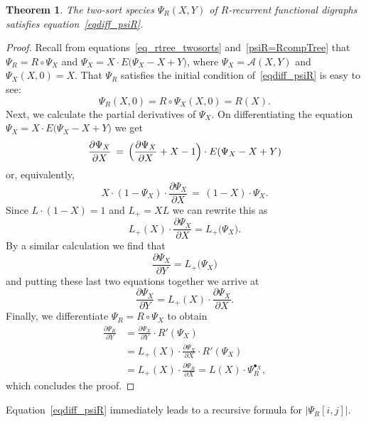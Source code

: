 \documentclass[a4paper,11pt,UKenglish]{article}
\newcommand{\Set}{E}
\newcommand{\Lin}{L}
\newcommand{\rtree}{\mathcal{A}}
\newcommand{\ddy}[1]{\displaystyle{\frac{\partial{#1}}{\partial Y}}}
\newcommand{\ddx}[1]{\displaystyle{\frac{\partial{#1}}{\partial X}}}
\newcommand{\pointX}{^{\bullet_X}}
\newtheorem{theorem}{Theorem}[section]
\theoremstyle{definition}
\begin{document}
\begin{theorem}\label{psiX=tree}
  The two-sort species $\Psi_R(X,Y)$ of $R$-recurrent functional
  digraphs satisfies equation~\eqref{eqdiff_psiR}.
\end{theorem}
\begin{proof}
  Recall from equations~\eqref{eq_rtree_twosorts}
  and~\eqref{psiR=RcompTree} that $\Psi_R=R\circ\Psi_X$ and
  $\Psi_X=X\cdot\Set\bigl(\Psi_X-X+Y\bigr)$, where
  $\Psi_X=\rtree(X,Y)$ and $\Psi_X(X,0)=X$. That $\Psi_R$ satisfies
  the initial condition of~\eqref{eqdiff_psiR} is easy to see:
  \[
    \Psi_R(X,0)=R\circ\Psi_X(X,0)=R(X).
  \]
  Next, we calculate the partial derivatives of $\Psi_X$. On differentiating
  the equation $\Psi_X=X\cdot\Set\bigl(\Psi_X-X+Y\bigr)$ we get
  \[
    \ddx{\Psi_X} \,=\, \Bigl(\ddx{\Psi_X} + X - 1\Bigr)\cdot \Set(\Psi_X-X+Y)
  \]
  or, equivalently,
  \[
    X\cdot(1-\Psi_X)\cdot \ddx{\Psi_X} \,=\, (1-X)\cdot \Psi_X.
  \]
  Since $\Lin\cdot (1-X) = 1$ and $\Lin_+ = X\Lin$ we can rewrite this as
  \begin{equation*}
    \Lin_+(X)\cdot \ddx{\Psi_X} = \Lin_+\bigl(\Psi_X\bigr).
  \end{equation*}
  By a similar calculation we find that
  \begin{equation*}
    \ddy{\Psi_X} = \Lin_+\bigl(\Psi_X\bigr)
  \end{equation*}
  and putting these last two equations together we arrive at
  \[
    \ddy{\Psi_X} = \Lin_+(X) \cdot \ddx{\Psi_X}.
  \]
  Finally, we differentiate $\Psi_R=R\circ\Psi_X$ to obtain
  \begin{align*}
    \ddy{\Psi_R} &= \ddy{\Psi_X} \cdot R'(\Psi_X) \\
                 &= \Lin_+(X) \cdot \ddx{\Psi_X} \cdot R'(\Psi_X) \\
                 &= \Lin_+(X) \cdot \ddx{\Psi_R}
                 = \Lin(X)\cdot \Psi_R\pointX,
  \end{align*}
  which concludes the proof.
\end{proof}

Equation~\eqref{eqdiff_psiR} immediately leads to a recursive
formula for $|\Psi_R[i,j]|$.
\end{document}
